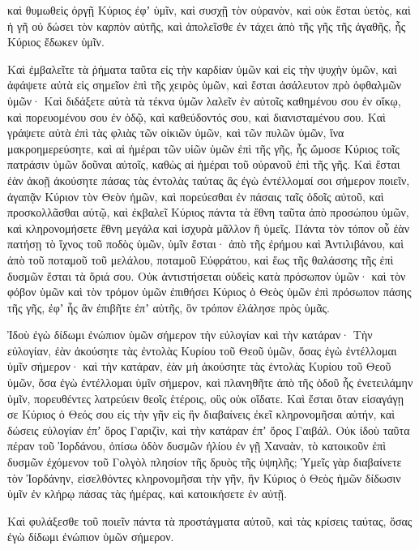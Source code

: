 {καὶ θυμωθεὶς ὀργῇ Κύριος ἐφʼ ὑμῖν, καὶ συσχῇ τὸν οὐρανὸν, καὶ οὐκ ἔσται ὑετὸς, καὶ ἡ γῆ οὐ δώσει τὸν καρπὸν αὐτῆς, καὶ ἀπολεῖσθε ἐν τάχει ἀπὸ τῆς γῆς τῆς ἀγαθῆς, ἧς Κύριος ἔδωκεν ὑμῖν.
\par }{\PP {}Καὶ ἐμβαλεῖτε τὰ ῥήματα ταῦτα εἰς τὴν καρδίαν ὑμῶν καὶ εἰς τὴν ψυχὴν ὑμῶν, καὶ ἀφάψετε αὐτὰ εἰς σημεῖον ἐπὶ τῆς χειρὸς ὑμῶν, καὶ ἔσται ἀσάλευτον πρὸ ὀφθαλμῶν ὑμῶν·
Καὶ διδάξετε αὐτὰ τὰ τέκνα ὑμῶν λαλεῖν ἐν αὐτοῖς καθημένου σου ἐν οἴκῳ, καὶ πορευομένου σου ἐν ὁδῷ, καὶ καθεύδοντός σου, καὶ διανισταμένου σου.
Καὶ γράψετε αὐτὰ ἐπὶ τὰς φλιὰς τῶν οἰκιῶν ὑμῶν, καὶ τῶν πυλῶν ὑμῶν,
ἵνα μακροημερεύσητε, καὶ αἱ ἡμέραι τῶν υἱῶν ὑμῶν ἐπὶ τῆς γῆς, ἧς ὤμοσε Κύριος τοῖς πατράσιν ὑμῶν δοῦναι αὐτοῖς, καθὼς αἱ ἡμέραι τοῦ οὐρανοῦ ἐπὶ τῆς γῆς.
Καὶ ἔσται ἐὰν ἀκοῇ ἀκούσητε πάσας τὰς ἐντολὰς ταύτας ἃς ἐγὼ ἐντέλλομαί σοι σήμερον ποιεῖν, ἀγαπᾷν Κύριον τὸν Θεὸν ἡμῶν, καὶ πορεύεσθαι ἐν πάσαις ταῖς ὁδοῖς αὐτοῦ, καὶ προσκολλᾶσθαι αὐτῷ,
καὶ ἐκβαλεῖ Κύριος πάντα τὰ ἔθνη ταῦτα ἀπὸ προσώπου ὑμῶν, καὶ κληρονομήσετε ἔθνη μεγάλα καὶ ἰσχυρὰ μᾶλλον ἢ ὑμεῖς.
Πάντα τὸν τόπον οὗ ἐὰν πατήσῃ τὸ ἴχνος τοῦ ποδὸς ὑμῶν, ὑμῖν ἔσται· ἀπὸ τῆς ἐρήμου καὶ Ἀντιλιβάνου, καὶ ἀπὸ τοῦ ποταμοῦ τοῦ μελάλου, ποταμοῦ Εὐφράτου, καὶ ἕως τῆς θαλάσσης τῆς ἐπὶ δυσμῶν ἔσται τὰ ὅριά σου.
Οὐκ ἀντιστήσεται οὐδεὶς κατὰ πρόσωπον ὑμῶν· καὶ τὸν φόβον ὑμῶν καὶ τὸν τρόμον ὑμῶν ἐπιθήσει Κύριος ὁ Θεὸς ὑμῶν ἐπὶ πρόσωπον πάσης τῆς γῆς, ἐφʼ ἧς ἂν ἐπιβῆτε ἐπʼ αὐτῆς, ὃν τρόπον ἐλάλησε πρὸς ὑμᾶς.
\par }{\PP {}Ἰδοὺ ἐγὼ δίδωμι ἐνώπιον ὑμῶν σήμερον τὴν εὐλογίαν καὶ τὴν κατάραν·
Τὴν εὐλογίαν, ἐὰν ἀκούσητε τὰς ἐντολὰς Κυρίου τοῦ Θεοῦ ὑμῶν, ὅσας ἐγὼ ἐντέλλομαι ὑμῖν σήμερον·
καὶ τὴν κατάραν, ἐὰν μὴ ἀκούσητε τὰς ἐντολὰς Κυρίου τοῦ Θεοῦ ὑμῶν, ὅσα ἐγὼ ἐντέλλομαι ὑμῖν σήμερον, καὶ πλανηθῆτε ἀπὸ τῆς ὁδοῦ ἧς ἐνετειλάμην ὑμῖν, πορευθέντες λατρεύειν θεοῖς ἑτέροις, οὓς οὐκ οἴδατε.
Καὶ ἔσται ὅταν εἰσαγάγῃ σε Κύριος ὁ Θεός σου εἰς τὴν γῆν εἰς ἣν διαβαίνεις ἐκεῖ κληρονομῆσαι αὐτήν, καὶ δώσεις εὐλογίαν ἐπʼ ὄρος Γαριζὶν, καὶ τὴν κατάραν ἐπʼ ὄρος Γαιβάλ.
Οὐκ ἰδοὺ ταῦτα πέραν τοῦ Ἰορδάνου, ὀπίσω ὁδὸν δυσμῶν ἡλίου ἐν γῇ Χαναὰν, τὸ κατοικοῦν ἐπὶ δυσμῶν ἐχόμενον τοῦ Γολγὸλ πλησίον τῆς δρυὸς τῆς ὑψηλῆς;
Ὑμεῖς γὰρ διαβαίνετε τὸν Ἰορδάνην, εἰσελθόντες κληρονομῆσαι τὴν γῆν, ἣν Κύριος ὁ Θεὸς ἡμῶν δίδωσιν ὑμῖν ἐν κλήρῳ πάσας τὰς ἡμέρας, καὶ κατοικήσετε ἐν αὐτῇ.
\par }{\PP {}Καὶ φυλάξεσθε τοῦ ποιεῖν πάντα τὰ προστάγματα αὐτοῦ, καὶ τὰς κρίσεις ταύτας, ὅσας ἐγὼ δίδωμι ἐνώπιον ὑμῶν σήμερον.

}
